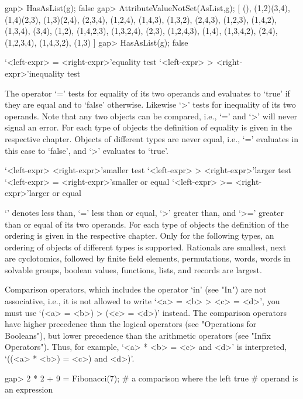 \beginexample
gap> HasAsList(g);
false
gap> AttributeValueNotSet(AsList,g);
[ (), (1,2)(3,4), (1,4)(2,3), (1,3)(2,4), (2,3,4), (1,2,4), (1,4,3),
(1,3,2), 
  (2,4,3), (1,2,3), (1,4,2), (1,3,4), (3,4), (1,2), (1,4,2,3), (1,3,2,4), 
  (2,3), (1,2,4,3), (1,4), (1,3,4,2), (2,4), (1,2,3,4), (1,4,3,2), (1,3) ]
gap> HasAsList(g);
false
\endexample



\>`<left-expr> =  <right-expr>'{equality test}
\>`<left-expr> \<> <right-expr>'{inequality test}

The operator `=' tests for equality of its two operands and evaluates to
`true' if they are equal and to `false' otherwise. Likewise `\<>' tests
for inequality of its two operands. Note that any two objects can be
compared, i.e., `=' and `\<>' will never signal an error. For each type
of objects the definition of equality is given in the respective chapter.
Objects of different types are never equal, i.e., `=' evaluates in this
case to `false', and `\<>' evaluates to `true'.

\>`<left-expr> \< <right-expr>'{smaller test}
\>`<left-expr> >  <right-expr>'{larger test}
\>`<left-expr> \<= <right-expr>'{smaller or equal}
\>`<left-expr> >= <right-expr>'{larger or equal}

`\<' denotes less than, `\<=' less than or equal, `>' greater than, and
`>=' greater than or equal of its two operands. For each type of objects
the definition of the ordering is given in the respective chapter.
Only for the following types, an ordering of objects of different types
is supported.
Rationals are smallest, next are cyclotomics,
followed by finite field elements, permutations, words,
words in solvable groups, boolean values, functions,
lists, and records are largest.

Comparison operators, which includes the operator `in' (see "In") are not
associative, i.e., it is not allowed to write `<a> = <b> \<> <c> = <d>',
you must use `(<a> = <b>) \<> (<c> = <d>)' instead. The comparison
operators have  higher precedence  than  the logical operators (see
"Operations for Booleans"), but lower precedence than the arithmetic
operators (see "Infix Operators"). Thus, for example, `<a> * <b> = <c> and
<d>' is interpreted, `((<a> * <b>) = <c>) and <d>)'.

\beginexample
gap> 2 * 2 + 9 = Fibonacci(7);  # a comparison where the left
true               # operand is an expression
\endexample

